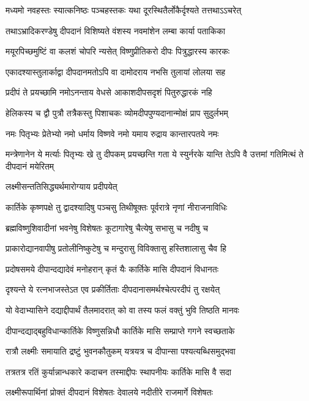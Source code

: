 \twolineshloka
{मध्यमो नवहस्तः स्यात्कनिष्ठः पञ्चहस्तकः}
{यथा दूरस्थितैर्लोकैर्दृश्यते तत्तथाऽऽचरेत्} %

\twolineshloka
{तथाऽभ्रादिकरण्डेषु दीपदानं विशिष्यते}
{वंशस्य नवमांशेन लम्बा कार्या पताकिका} %

\twolineshloka
{मयूरपिच्छमुष्टिं वा कलशं चोपरि न्यसेत्}
{विष्णुप्रीतिकरो दीपः पित्रुद्धारस्य कारकः} %

\twolineshloka
{एकादश्यास्तुलार्काद्वा दीपदानमतोऽपि वा}
{दामोदराय नभसि तुलायां लोलया सह} %

\twolineshloka
{प्रदीपं ते प्रयच्छामि नमोऽनन्ताय वेधसे}
{आकाशदीपसदृशं पितुरुद्धारकं नहि} %

\twolineshloka
{हेलिकस्य च द्वौ पुत्रौ तत्रैकस्तु पिशाचकः}
{व्योमदीपपुण्यदानान्मोक्षं प्राप सुदुर्लभम्} %

\twolineshloka
{नमः पितृभ्यः प्रेतेभ्यो नमो धर्माय विष्णवे}
{नमो यमाय रुद्राय कान्तारपतये नमः} %

\threelineshloka
{मन्त्रेणानेन ये मर्त्याः पितृभ्यः खे तु दीपकम्}
{प्रयच्छन्ति गता ये स्युर्नरके यान्ति तेऽपि वै}
{उत्तमां गतिमित्थं ते दीपदानं मयेरितम्} %


\onelineshloka
{लक्ष्मीसन्ततिसिद्ध्यर्थमारोग्याय प्रदीपयेत्} %

\twolineshloka
{कार्तिके कृष्णपक्षे तु द्वादश्यादिषु पञ्चसु}
{तिथीषूक्तः पूर्वरात्रे नृणां नीराजनाविधिः} %

\twolineshloka
{ब्रह्मविष्णुशिवादीनां भवनेषु विशेषतः}
{कूटागारेषु चैत्येषु सभासु च नदीषु च} %

\twolineshloka
{प्राकारोद्यानवापीषु प्रतोलीनिष्कुटेषु च}
{मन्दुरासु विविक्तासु हस्तिशालासु चैव हि} %

\twolineshloka
{प्रदोषसमये दीपान्दद्यादेवं मनोहरान्}
{कृतं यैः कार्तिके मासि दीपदानं विधानतः} %

\twolineshloka
{दृश्यन्ते ये रत्नभाजस्तेऽत एव प्रकीर्तिताः}
{दीपदानासमर्थश्चेत्परदीपं तु रक्षयेत्} %

\twolineshloka
{यो वेदाभ्यासिने दद्याद्दीपार्थं तैलमादरात्}
{को वा तस्य फलं वक्तुं भुवि तिष्ठति मानवः} %

\twolineshloka
{दीपान्दद्याद्बहुविधान्कार्तिके विष्णुसन्निधौ}
{कार्तिके मासि सम्प्राप्ते गगने स्वच्छताके} %

\twolineshloka
{रात्रौ लक्ष्मीः समायाति द्रष्टुं भुवनकौतुकम्}
{यत्रयत्र च दीपान्सा पश्यत्यब्धिसमुद्भवा} %

\twolineshloka
{तत्रतत्र रतिं कुर्यान्नान्धकारे कदाचन}
{तस्माद्दीपः स्थापनीयः कार्तिके मासि वै सदा} %

\twolineshloka
{लक्ष्मीरूपार्थिनां प्रोक्तं दीपदानं विशेषतः}
{देवालये नदीतीरे राजमार्गे विशेषतः} %

